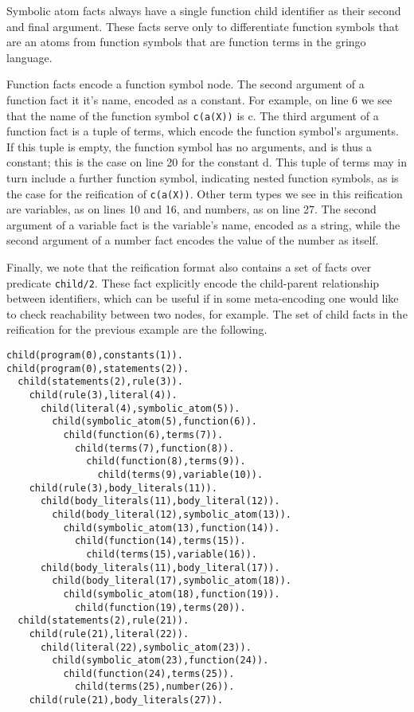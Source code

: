 Symbolic atom facts always have a single function child identifier as
their second and final argument. These facts serve only to
differentiate function symbols that are an atoms from function symbols
that are function terms in the gringo language.

Function facts encode a function symbol node. The second argument of a
function fact it it's name, encoded as a constant. For example, on
line 6 we see that the name of the function symbol \texttt{c(a(X))} is
c. The third argument of a function fact is a tuple of terms, which
encode the function symbol's arguments. If this tuple is empty, the
function symbol has no arguments, and is thus a constant; this is the
case on line 20 for the constant d. This tuple of terms may in turn
include a further function symbol, indicating nested function symbols,
as is the case for the reification of \texttt{c(a(X))}. Other term
types we see in this reification are variables, as on lines 10 and 16,
and numbers, as on line 27. The second argument of a variable fact is
the variable's name, encoded as a string, while the second argument of
a number fact encodes the value of the number as itself.

Finally, we note that the reification format also contains a set of
facts over predicate \texttt{child/2}. These fact explicitly encode
the child-parent relationship between identifiers, which can be useful
if in some meta-encoding one would like to check reachability between
two nodes, for example. The set of child facts in the reification for
the previous example are the following.

\begin{lstlisting}[language=clingo]
child(program(0),constants(1)).
child(program(0),statements(2)).
  child(statements(2),rule(3)).
    child(rule(3),literal(4)).
      child(literal(4),symbolic_atom(5)).
        child(symbolic_atom(5),function(6)).
          child(function(6),terms(7)).
            child(terms(7),function(8)).
              child(function(8),terms(9)).
                child(terms(9),variable(10)).
    child(rule(3),body_literals(11)).
      child(body_literals(11),body_literal(12)).
        child(body_literal(12),symbolic_atom(13)).
          child(symbolic_atom(13),function(14)).
            child(function(14),terms(15)).
              child(terms(15),variable(16)).
      child(body_literals(11),body_literal(17)).
        child(body_literal(17),symbolic_atom(18)).
          child(symbolic_atom(18),function(19)).
            child(function(19),terms(20)).
  child(statements(2),rule(21)).
    child(rule(21),literal(22)).
      child(literal(22),symbolic_atom(23)).
        child(symbolic_atom(23),function(24)).
          child(function(24),terms(25)).
            child(terms(25),number(26)).
    child(rule(21),body_literals(27)).
\end{lstlisting}

